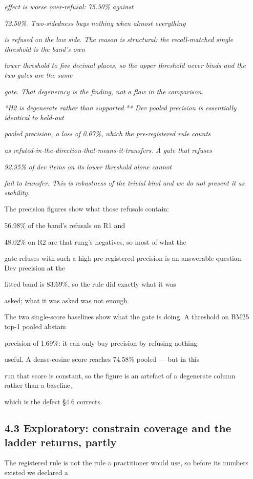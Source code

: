 \textit{effect is worse over-refusal: 75.50\% against}

\textit{72.50\%. Two-sidedness buys nothing when almost everything}

\textit{is refused on the low side. The reason is structural: the recall-matched single threshold is the band's own}

\textit{lower threshold to five decimal places, so the upper threshold never binds and the two gates are the same}

\textit{gate. That degeneracy is the finding, not a flaw in the comparison.}

\textit{*H2 is degenerate rather than supported.** Dev pooled precision is essentially identical to held-out}

\textit{pooled precision, a loss of 0.07\%, which the pre-registered rule counts}

\textit{as refuted-in-the-direction-that-means-it-transfers. A gate that refuses}

\textit{92.95\% of dev items on its lower threshold alone cannot}

\textit{fail to transfer. This is robustness of the trivial kind and we do not present it as stability.}

The precision figures show what those refusals contain:

56.98\% of the band's refusals on R1 and

48.02\% on R2 are that rung's negatives, so most of what the

gate refuses with such a high pre-registered precision is an answerable question. Dev precision at the

fitted band is 83.69\%, so the rule did exactly what it was

asked; what it was asked was not enough.

The two single-score baselines show what the gate is doing. A threshold on BM25 top-1 pooled abstain

precision of 1.69\%: it can only buy precision by refusing nothing

useful. A dense-cosine score reaches 74.58\% pooled --- but in this

run that score is constant, so the figure is an artefact of a degenerate column rather than a baseline,

which is the defect §4.6 corrects.

\subsection{4.3 Exploratory: constrain coverage and the ladder returns, partly}
The registered rule is not the rule a practitioner would use, so before its numbers existed we declared a

